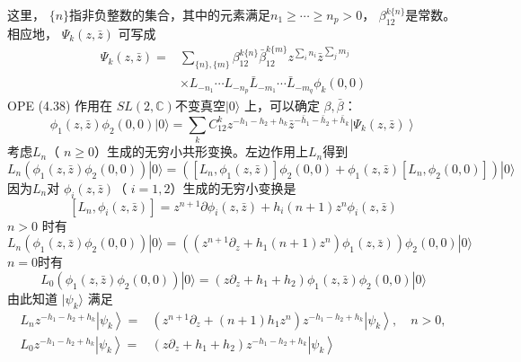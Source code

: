 这里， $\{n\} $指非负整数的集合，其中的元素满足$ n_{1} \geq \cdots \geq n_{p}>0 $， $\beta_{12}^{k\{n\}} $是常数。相应地， $\Psi_{k}(z, \bar{z})$ 可写成
\begin{equation}
\begin{aligned} \Psi_{k}(z, \bar{z})=& \sum_{\{n\},\{m\}} \beta_{12}^{k\{n\}} \bar{\beta}_{12}^{k\{m\}} z^{\sum_{i} n_{i}} \bar{z}^{\sum_jm_{j}} \\ & \times L_{-n_{1}} \cdots L_{-n_{p}} \bar{L}_{-m_{1}} \cdots \bar{L}_{-m_{q}} \phi_{k}(0,0) \end{aligned}
\end{equation}
OPE (4.38) 作用在 $SL(2,\mathbb{C}) $不变真空$ |0\rangle$ 上，可以确定 $\beta,\bar{\beta} $：
\begin{equation}
	\phi_{1}(z, \bar{z}) \phi_{2}(0,0)|0\rangle=\sum_{k} C_{12}^{k} z^{-h_{1}-h_{2}+h_{k}} \bar{z}^{-\bar{h}_{1}-\bar{h}_{2}+\bar{h}_{k}}\left|\Psi_{k}(z, \bar{z})\right\rangle
\end{equation}
考虑$ L_n $（ $n\geq 0 $）生成的无穷小共形变换。左边作用上$ L_n $得到
\begin{equation}
	L_{n}\left(\phi_{1}(z, \bar{z}) \phi_{2}(0,0)\right)|0\rangle=\left(\left[L_{n}, \phi_{1}(z, \bar{z})\right] \phi_{2}(0,0)+\phi_{1}(z, \bar{z})\left[L_{n}, \phi_{2}(0,0)\right]\right)|0\rangle
\end{equation}
因为$ L_n $对 $\phi_i(z,\bar{z}) $（ $i=1,2 $）生成的无穷小变换是
\begin{equation}
	\left[L_{n}, \phi_{i}(z, \bar{z})\right]=z^{n+1} \partial \phi_{i}(z, \bar{z})+h_{i}(n+1) z^{n} \phi_{i}(z, \bar{z})
\end{equation}
$n>0$ 时有
\begin{equation}
L_{n}\left(\phi_{1}(z, \bar{z}) \phi_{2}(0,0)\right)|0\rangle=\left(\left(z^{n+1} \partial_{z}+h_{1}(n+1) z^{n}\right) \phi_{1}(z, \bar{z})\right) \phi_{2}(0,0)|0\rangle	
\end{equation}
$n=0 $时有
\begin{equation}
L_{0}\left(\phi_{1}(z, \bar{z}) \phi_{2}(0,0)\right)|0\rangle=\left(z \partial_{z}+h_{1}+h_{2}\right) \phi_{1}(z, \bar{z}) \phi_{2}(0,0)|0\rangle	
\end{equation}
由此知道 $|\psi_k\rangle$ 满足
\begin{align}
	L_{n} z^{-h_{1}-h_{2}+h_{k}}\left|\psi_{k}\right\rangle=&\left(z^{n+1} \partial_{z}+(n+1) h_{1} z^{n}\right) z^{-h_{1}-h_{2}+h_{k}}\left|\psi_{k}\right\rangle, \quad n>0,\\ L_{0} z^{-h_{1}-h_{2}+h_{k}}\left|\psi_{k}\right\rangle=&\left(z \partial_{z}+h_{1}+h_{2}\right) z^{-h_{1}-h_{2}+h_{k}}\left|\psi_{k}\right\rangle 
\end{align}
